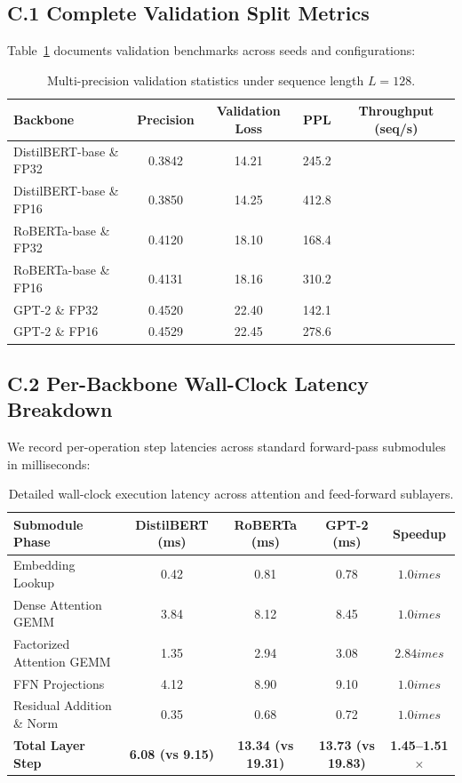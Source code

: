 \subsection*{C.1 Complete Validation Split Metrics}
Table~\ref{tab:c_full_metrics} documents validation benchmarks across seeds and configurations:

\begin{table}[H]
\centering
\small
\begin{tabularx}{\linewidth}{lcccc}
\toprule
\textbf{Backbone} & \textbf{Precision} & \textbf{Validation Loss} & \textbf{PPL} & \textbf{Throughput (seq/s)} \\
\midrule
DistilBERT-base \& FP32 & 0.3842 & 14.21 & 245.2 \\
DistilBERT-base \& FP16 & 0.3850 & 14.25 & 412.8 \\
RoBERTa-base \& FP32 & 0.4120 & 18.10 & 168.4 \\
RoBERTa-base \& FP16 & 0.4131 & 18.16 & 310.2 \\
GPT-2 \& FP32 & 0.4520 & 22.40 & 142.1 \\
GPT-2 \& FP16 & 0.4529 & 22.45 & 278.6 \\
\bottomrule
\end{tabularx}
\caption{Multi-precision validation statistics under sequence length $L=128$.}
\label{tab:c_full_metrics}
\end{table}

\subsection*{C.2 Per-Backbone Wall-Clock Latency Breakdown}
We record per-operation step latencies across standard forward-pass submodules in milliseconds:
\begin{table}[H]
\centering
\small
\begin{tabularx}{\linewidth}{lcccc}
\toprule
\textbf{Submodule Phase} & \textbf{DistilBERT (ms)} & \textbf{RoBERTa (ms)} & \textbf{GPT-2 (ms)} & \textbf{Speedup} \\
\midrule
Embedding Lookup & 0.42 & 0.81 & 0.78 & $1.0	imes$ \\
Dense Attention GEMM & 3.84 & 8.12 & 8.45 & $1.0	imes$ \\
Factorized Attention GEMM & 1.35 & 2.94 & 3.08 & $2.84	imes$ \\
FFN Projections & 4.12 & 8.90 & 9.10 & $1.0	imes$ \\
Residual Addition \& Norm & 0.35 & 0.68 & 0.72 & $1.0	imes$ \\
\midrule
\textbf{Total Layer Step} & \textbf{6.08 (vs 9.15)} & \textbf{13.34 (vs 19.31)} & \textbf{13.73 (vs 19.83)} & \textbf{1.45--1.51$\times$} \\
\bottomrule
\end{tabularx}
\caption{Detailed wall-clock execution latency across attention and feed-forward sublayers.}
\label{tab:latency_breakdown}
\end{table}

